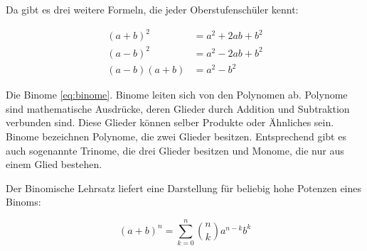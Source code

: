 
Da gibt es drei weitere Formeln, die jeder Oberstufenschüler kennt: 

\begin{align}
  (a+b)^{2}  &= a^{2} + 2ab + b^{2}   \label{eq:binome} \\
  (a-b)^{2}  &= a^{2} - 2ab + b^{2}   \nonumber         \\
  (a-b)(a+b) &= a^{2} - b^{2}         \nonumber
\end{align}

Die Binome \eqref{eq:binome}. Binome leiten sich von den Polynomen ab. Polynome sind mathematische Ausdrücke, deren Glieder durch Addition und Subtraktion verbunden sind. Diese Glieder können selber Produkte oder Ähnliches sein. Binome bezeichnen Polynome, die zwei Glieder besitzen. Entsprechend gibt es auch sogenannte Trinome, die drei Glieder besitzen und Monome, die nur aus einem Glied bestehen. 

\bigskip 

Der Binomische Lehrsatz liefert eine Darstellung für beliebig hohe Potenzen eines Binoms:

\begin{equation}
  (a+b)^n = \sum_{k=0}^n \binom{n}{k} a^{n-k} b^k
\end{equation}
